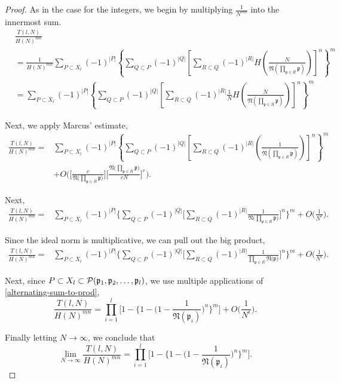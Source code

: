 \documentclass[10pt,a4paper]{article}
\theoremstyle{definition}
\theoremstyle{remark}
\newcommand{\f}[1]{\mathfrak{#1}}
\begin{document}
	\begin{proof}
	As in the case for the integers, we begin by multiplying \(\frac{1}{N^{mn}}\) into the innermost sum.
	\begin{align}
		&\frac{T(l,N)}{H(N)^{mn}} \\
		&= \frac{1}{H(N)^{mn}}\sum_{P\subset X_l}(-1)^{|P|} \left\{\sum_{Q\subset P} (-1)^{|Q|} \left[\sum_{R\subset Q}(-1)^{|R|}H\left(\frac{N}{\f{N}\left(\prod_{\f{p}\in R}\f{p}\right)}\right)\right]^n\right\}^m\\
		&=\sum_{P\subset X_l}(-1)^{|P|} \left\{\sum_{Q\subset P} (-1)^{|Q|} \left[\sum_{R\subset Q}(-1)^{|R|}\frac{1}{N}H\left(\frac{N}{\f{N}\left(\prod_{\f{p}\in R}\f{p}\right)}\right)\right]^n\right\}^m
	\end{align}

	Next, we apply Marcus' estimate,
	\begin{align}
		\frac{T(l,N)}{H(N)^{mn}}=&\sum_{P\subset X_l}(-1)^{|P|} \left\{\sum_{Q\subset P} (-1)^{|Q|} \left[\sum_{R\subset Q}(-1)^{|R|}\left(\frac{1}{\f{N}\left(\prod_{\f{p}\in R}\f{p}\right)}\right)\right]^n\right\}^m \\
		&+ O\Biggl(\Biggl[\frac{c}{\f{N}\bigl(\prod_{\f{p}\in R}\f{p}\bigr)}\Biggl]\Biggr[\frac{\f{N}\bigl(\prod_{\f{p}\in R}\f{p}\bigr)}{cN}\Biggr]^{\varepsilon}\Biggr).
	\end{align}

	Next,
	\begin{equation}
	\begin{split}
		\frac{T(l,N)}{H(N)^{mn}}=&\sum_{P\subset X_l}(-1)^{|P|} \Big\{\sum_{Q\subset P} (-1)^{|Q|} \Big[\sum_{R\subset Q}(-1)^{|R|}\frac{1}{\f{N}\Big(\prod_{\f{p}\in R}\f{p}\Big)} \Big]^n\Big\}^m + O\Big(\frac{1}{N^{\epsilon}}\Big).
	\end{split}
	\end{equation}

	Since the ideal norm is multiplicative, we can pull out the big product,
	\begin{equation}
	\begin{split}
		\frac{T(l,N)}{H(N)^{mn}}=&\sum_{P\subset X_l}(-1)^{|P|} \Biggl\{\sum_{Q\subset P} (-1)^{|Q|} \Biggl[\sum_{R\subset Q}(-1)^{|R|}\frac{1}{\prod_{\f{p}\in R}\f{N}\bigl(\f{p}\bigr)}\Biggr]^n\Biggr\}^m + O\Big(\frac{1}{N^{\epsilon}}\Big).
	\end{split}
        \end{equation}

	Next, since \(P\subset X_l \subset \mathcal{P}(\f{p}_1,\f{p}_2,\mathellipsis,\f{p}_l)\), we use multiple applications of \cref{alternating-sum-to-prod},
		$$\frac{T(l,N)}{H(N)^{mn}}=\prod_{i=1}^{l}\Biggr[1-\Biggr\{1-\Biggl(1-\frac{1}{\f{N}(\f{p}_i)}\Biggr)^n\Biggr\}^m\Biggr] + O\Big(\frac{1}{N^{\epsilon}}\Big).$$
		
\noindent Finally letting $N \to \infty$, we conclude that
$$\lim_{N\to\infty} \frac{T(l,N)}{H(N)^{mn}} = \prod_{i=1}^{l}\Big[1-\Big\{1-\Big(1-\frac{1}{\f{N}(\f{p}_i)}\Big)^n\Big\}^m\Big].$$

\end{proof}
\end{document}
